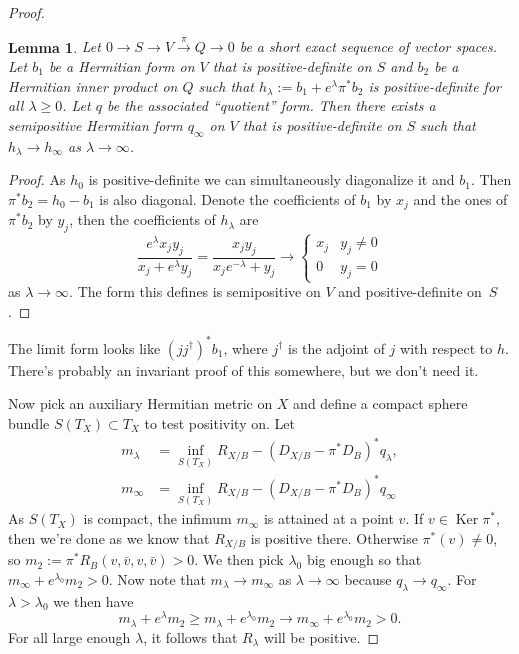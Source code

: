 \documentclass[10pt,a4paper]{amsart}
\newtheorem{lemm}[theo]{Lemma}
\theoremstyle{definition}
\DeclareMathOperator{\Ker}{Ker}
\begin{document}
\begin{proof}
\begin{lemm}
\label{lemm:limit-form}
Let $0 \to S \to V \stackrel{\pi}{\to} Q \to 0$ be a short exact sequence of vector spaces.
Let $b_{1}$ be a Hermitian form on $V$ that is positive-definite on $S$ and $b_{2}$ be a Hermitian inner product on $Q$ such that $h_{\lambda} := b_{1} + e^{\lambda} \pi^{*} b_{2}$ is positive-definite for all $\lambda \geq 0$.
Let $q$ be the associated ``quotient'' form.
Then there exists a semipositive Hermitian form $q_{\infty}$ on $V$ that is positive-definite on $S$ such that $h_{\lambda} \to h_{\infty}$ as $\lambda \to \infty$.
\end{lemm}


\begin{proof}
As $h_{0}$ is positive-definite we can simultaneously diagonalize it and $b_{1}$.
Then $\pi^{*}b_{2} = h_{0} - b_{1}$ is also diagonal.
Denote the coefficients of $b_{1}$ by $x_{j}$ and the ones of $\pi^{*}b_{2}$ by $y_{j}$, then the coefficients of $h_{\lambda}$ are
\[
  \frac{e^{\lambda}x_{j} y_{j}}{x_{j} + e^{\lambda} y_{j}}
  = \frac{x_{j} y_{j}}{x_{j}e^{-\lambda} + y_{j}}
  \to
  \begin{cases}
    x_{j} & y_{j} \not= 0
    \\
    0 & y_{j} = 0
  \end{cases}
\]
as $\lambda \to \infty$.
The form this defines is semipositive on $V$ and positive-definite on~$S$.%
\end{proof}

The limit form looks like $(j j^{\dagger})^{*}b_{1}$, where $j^{\dagger}$ is
the adjoint of $j$ with respect to $h$. There's probably an invariant proof of
this somewhere, but we don't need it.

Now pick an auxiliary Hermitian metric on $X$ and define a compact sphere bundle
$S(T_X) \subset T_X$ to test positivity on.
Let
\begin{align*}
m_\lambda &=
\inf_{S(T_X)} R_{X/B}
- (D_{X/B} - \pi^* D_{B})^* q_{\lambda},
\\
m_\infty &=
\inf_{S(T_X)} R_{X/B}
- (D_{X/B} - \pi^* D_{B})^* q_{\infty}
\end{align*}
As $S(T_X)$ is compact, the infimum $m_\infty$ is attained at a point $v$.
If $v \in \Ker \pi^*$, then we're done as we know that $R_{X/B}$ is positive
there.
Otherwise $\pi^*(v) \not= 0$, so $m_2 := \pi^*R_B(v, \bar v, v, \bar v) > 0$.
We then pick $\lambda_0$ big enough so that $m_\infty + e^{\lambda_0} m_2 > 0$.
Now note that
$m_\lambda \to m_\infty$ as $\lambda \to \infty$ because $q_{\lambda} \to
q_{\infty}$.
For $\lambda > \lambda_0$ we then have
$$
m_\lambda + e^\lambda m_2
\geq m_\lambda + e^{\lambda_0} m_2
\to m_\infty  + e^{\lambda_0} m_2
> 0.
$$
For all large enough $\lambda$, it follows that $R_\lambda$ will be positive.
\end{proof}
\end{document}

